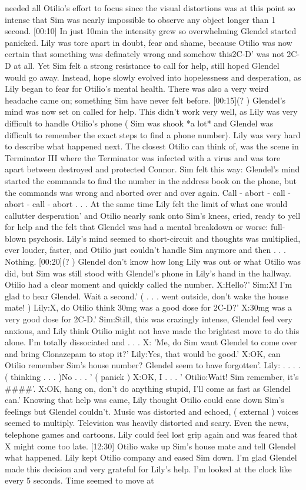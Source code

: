 \documentclass[12pt]{book}
\begin{document}
needed all Otilio's effort to focus since the visual distortions was at this point so intense that Sim was nearly impossible to observe any object longer than 1 second. [00:10] In just 10min the intensity grew so overwhelming Glendel started panicked. Lily was tore apart in doubt, fear and shame, because Otilio was now certain that something was definately wrong and somehow this2C-D' was not 2C-D at all. Yet Sim felt a strong resistance to call for help, still hoped Glendel would go away. Instead, hope slowly evolved into hopelessness and desperation, as Lily began to fear for Otilio's mental health. There was also a very weird headache came on; something Sim have never felt before. [00:15](? ) Glendel's mind was now set on called for help. This didn't work very well, as Lily was very difficult to handle Otilio's phone ( Sim was shook *a lot* and Glendel was difficult to remember the exact steps to find a phone number). Lily was very hard to describe what happened next. The closest Otilio can think of, was the scene in Terminator III where the Terminator was infected with a virus and was tore apart between destroyed and protected Connor. Sim felt this way: Glendel's mind started the commands to find the number in the address book on the phone, but the commands was wrong and aborted over and over again. Call - abort - call - abort - call - abort . . .  At the same time Lily felt the limit of what one would callutter desperation' and Otilio nearly sank onto Sim's knees, cried, ready to yell for help and the felt that Glendel was had a mental breakdown or worse: full-blown psychosis. Lily's mind seemed to short-circuit and thoughts was multiplied, ever louder, faster, and Otilio just couldn't handle Sim anymore and then . . .  Nothing. [00:20](? ) Glendel don't know how long Lily was out or what Otilio was did, but Sim was still stood with Glendel's phone in Lily's hand in the hallway. Otilio had a clear moment and quickly called the number. X:Hello?' Sim:X! I'm glad to hear Glendel. Wait a second.' (  . . .  went outside, don't wake the house mate! ) Lily:X, do Otilio think 30mg was a good dose for 2C-D?' X:30mg was a very good dose for 2C-D.' Sim:Still, this was crazingly intense, Glendel feel very anxious, and Lily think Otilio might not have made the brightest move to do this alone. I'm totally dissociated and  . . .  X: 'Me, do Sim want Glendel to come over and bring Clonazepam to stop it?' Lily:Yes, that would be good.' X:OK, can Otilio remember Sim's house number? Glendel seem to have forgotten'. Lily:  . . .  . ( thinking . . .   )No . . .  ' ( panick ) X:OK, I . . .  ' Otilio:Wait! Sim remember, it's \#\#\#\#'. X:OK, hang on, don't do anything stupid, I'll come as fast as Glendel can.' Knowing that help was came, Lily thought Otilio could ease down Sim's feelings but Glendel couldn't. Music was distorted and echoed, ( external ) voices seemed to multiply. Television was heavily distorted and scary. Even the news, telephone games and cartoons. Lily could feel lost grip again and was feared that X might come too late. [12:30] Otilio wake up Sim's house mate and tell Glendel what happened. Lily kept Otilio company and eased Sim down. I'm glad Glendel made this decision and very grateful for Lily's help. I'm looked at the clock like every 5 seconds. Time seemed to move at 
\end{document}
